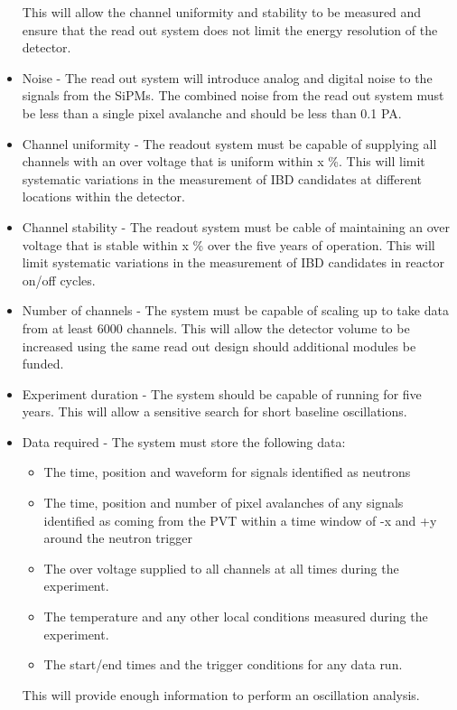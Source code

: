 \documentclass[a4paper]{article}
\begin{document}
\begin{itemize}
    This will allow the channel uniformity and stability to be measured and ensure that the read out system does not limit the energy resolution of the detector.
\item Noise - The read out system will introduce analog and digital noise to the signals from the SiPMs. 
    The combined noise from the read out system must be less than a single pixel avalanche and should be less than 0.1 PA.
\item Channel uniformity - The readout system must be capable of supplying all channels with an over voltage that is uniform within x \%. 
    This will limit systematic variations in the measurement of IBD candidates at different locations within the detector.
\item Channel stability - The readout system must be cable of maintaining an over voltage that is stable within x \% over the five years of operation. 
    This will limit systematic variations in the measurement of IBD candidates in reactor on/off cycles.
\item Number of channels - The system must be capable of scaling up to take data from at least 6000 channels. 
    This will allow the detector volume to be increased using the same read out design should additional modules be funded.  
\item Experiment duration - The system should be capable of running for five years. 
    This will allow a sensitive search for short baseline oscillations.
\item Data required - The system must store the following data: 
    \begin{itemize}
    \item The time, position and waveform for signals identified as neutrons
    \item The time, position and number of pixel avalanches of any signals identified as coming from the PVT within a time window of -x and +y around the neutron trigger
    \item The over voltage supplied to all channels at all times during the experiment.
    \item The temperature and any other local conditions measured during the experiment.
    \item The start/end times and the trigger conditions for any data run.   
    \end{itemize}
    This will provide enough information to perform an oscillation analysis.
\end{itemize}
\end{document}
